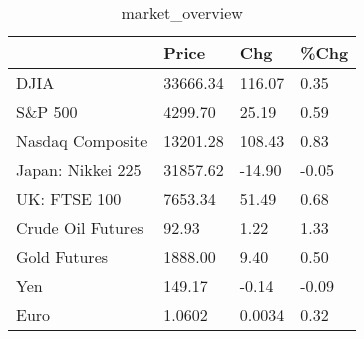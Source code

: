 \documentclass{article}%
\begin{document}
%


\begin{table}[htbp]%
\caption{market\_overview}%
\centering%
\begin{adjustbox}{width=1\textwidth}%
\begin{tabular}{llll}
\toprule
                  &    Price &    Chg &  \%Chg \\
\midrule
             DJIA & 33666.34 & 116.07 &  0.35 \\
          S\&P 500 &  4299.70 &  25.19 &  0.59 \\
 Nasdaq Composite & 13201.28 & 108.43 &  0.83 \\
Japan: Nikkei 225 & 31857.62 & -14.90 & -0.05 \\
     UK: FTSE 100 &  7653.34 &  51.49 &  0.68 \\
Crude Oil Futures &    92.93 &   1.22 &  1.33 \\
     Gold Futures &  1888.00 &   9.40 &  0.50 \\
              Yen &   149.17 &  -0.14 & -0.09 \\
             Euro &   1.0602 & 0.0034 &  0.32 \\
\bottomrule
\end{tabular}
%
\end{adjustbox}%
\end{table}

%
\end{document}
